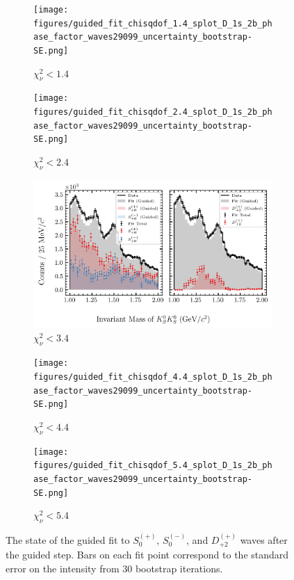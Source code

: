 \begin{figure}[htbp]
    \centering
    \begin{subfigure}{0.45\textwidth}
        \texttt{[image: figures/guided\_fit\_chisqdof\_1.4\_splot\_D\_1s\_2b\_phase\_factor\_waves29099\_uncertainty\_bootstrap-SE.png]}
        \caption{$\chi^2_\nu < 1.4$}
    \end{subfigure}
    \hfill
    \begin{subfigure}{0.45\textwidth}
        \texttt{[image: figures/guided\_fit\_chisqdof\_2.4\_splot\_D\_1s\_2b\_phase\_factor\_waves29099\_uncertainty\_bootstrap-SE.png]}
        \caption{$\chi^2_\nu < 2.4$}
    \end{subfigure}

    \vspace{1em}

    \begin{subfigure}{0.8\textwidth}
        \includegraphics[width=\linewidth]{figures/guided_fit_chisqdof_3.4_splot_D_1s_2b_phase_factor_waves29099_uncertainty_bootstrap-SE.png}
        \caption{$\chi^2_\nu < 3.4$}
    \end{subfigure}

    \vspace{1em}

    \begin{subfigure}{0.45\textwidth}
        \texttt{[image: figures/guided\_fit\_chisqdof\_4.4\_splot\_D\_1s\_2b\_phase\_factor\_waves29099\_uncertainty\_bootstrap-SE.png]}
        \caption{$\chi^2_\nu < 4.4$}
    \end{subfigure}
    \hfill
    \begin{subfigure}{0.45\textwidth}
        \texttt{[image: figures/guided\_fit\_chisqdof\_5.4\_splot\_D\_1s\_2b\_phase\_factor\_waves29099\_uncertainty\_bootstrap-SE.png]}
        \caption{$\chi^2_\nu < 5.4$}
    \end{subfigure}

    \caption{The state of the guided fit to $S_{0}^{(+)}$, $S_{0}^{(-)}$, and $D_{+2}^{(+)}$ waves after the guided step. Bars on each fit point correspond to the standard error on the intensity from $ 30 $ bootstrap iterations.}
    \label{fig:guided-fit-all-Spn-D2p}
\end{figure}

